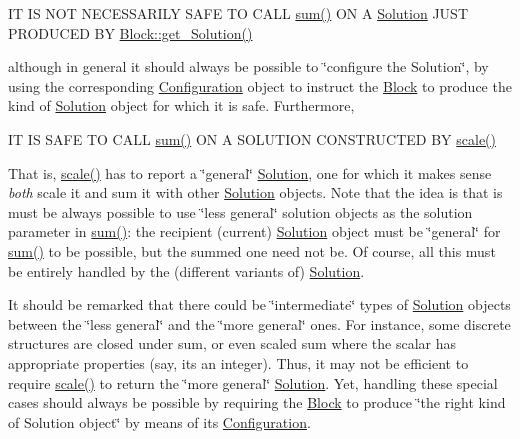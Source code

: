 IT IS N\+OT N\+E\+C\+E\+S\+S\+A\+R\+I\+LY S\+A\+FE TO C\+A\+LL \mbox{\hyperlink{class_s_m_spp__di__unipi__it_1_1_solution_adc2450947fd142657637bf79d91505a9}{sum()}} ON A \mbox{\hyperlink{class_s_m_spp__di__unipi__it_1_1_solution}{Solution}} J\+U\+ST P\+R\+O\+D\+U\+C\+ED BY \mbox{\hyperlink{class_s_m_spp__di__unipi__it_1_1_block_a1db67c2f65111af4314e79dfc81ba597}{Block\+::get\+\_\+\+Solution()}}

although in general it should always be possible to \char`\"{}configure the
\+Solution\char`\"{}, by using the corresponding \mbox{\hyperlink{class_s_m_spp__di__unipi__it_1_1_configuration}{Configuration}} object to instruct the \mbox{\hyperlink{class_s_m_spp__di__unipi__it_1_1_block}{Block}} to produce the kind of \mbox{\hyperlink{class_s_m_spp__di__unipi__it_1_1_solution}{Solution}} object for which it is safe. Furthermore,

IT IS S\+A\+FE TO C\+A\+LL \mbox{\hyperlink{class_s_m_spp__di__unipi__it_1_1_solution_adc2450947fd142657637bf79d91505a9}{sum()}} ON A S\+O\+L\+U\+T\+I\+ON C\+O\+N\+S\+T\+R\+U\+C\+T\+ED BY \mbox{\hyperlink{class_s_m_spp__di__unipi__it_1_1_solution_abf1a2d1763f128a72b2677d4b9ff4d3b}{scale()}}

That is, \mbox{\hyperlink{class_s_m_spp__di__unipi__it_1_1_solution_abf1a2d1763f128a72b2677d4b9ff4d3b}{scale()}} has to report a \char`\"{}general\char`\"{} \mbox{\hyperlink{class_s_m_spp__di__unipi__it_1_1_solution}{Solution}}, one for which it makes sense {\itshape both} scale it and sum it with other \mbox{\hyperlink{class_s_m_spp__di__unipi__it_1_1_solution}{Solution}} objects. Note that the idea is that is must be always possible to use \char`\"{}less
general\char`\"{} solution objects as the solution parameter in \mbox{\hyperlink{class_s_m_spp__di__unipi__it_1_1_solution_adc2450947fd142657637bf79d91505a9}{sum()}}\+: the recipient (current) \mbox{\hyperlink{class_s_m_spp__di__unipi__it_1_1_solution}{Solution}} object must be \char`\"{}general\char`\"{} for \mbox{\hyperlink{class_s_m_spp__di__unipi__it_1_1_solution_adc2450947fd142657637bf79d91505a9}{sum()}} to be possible, but the summed one need not be. Of course, all this must be entirely handled by the (different variants of) \mbox{\hyperlink{class_s_m_spp__di__unipi__it_1_1_solution}{Solution}}.

It should be remarked that there could be \char`\"{}intermediate\char`\"{} types of \mbox{\hyperlink{class_s_m_spp__di__unipi__it_1_1_solution}{Solution}} objects between the \char`\"{}less general\char`\"{} and the \char`\"{}more general\char`\"{} ones. For instance, some discrete structures are closed under sum, or even scaled sum where the scalar has appropriate properties (say, it\textquotesingle{}s an integer). Thus, it may not be efficient to require \mbox{\hyperlink{class_s_m_spp__di__unipi__it_1_1_solution_abf1a2d1763f128a72b2677d4b9ff4d3b}{scale()}} to return the \char`\"{}more general\char`\"{} \mbox{\hyperlink{class_s_m_spp__di__unipi__it_1_1_solution}{Solution}}. Yet, handling these special cases should always be possible by requiring the \mbox{\hyperlink{class_s_m_spp__di__unipi__it_1_1_block}{Block}} to produce \char`\"{}the right kind of Solution
object\char`\"{} by means of its \mbox{\hyperlink{class_s_m_spp__di__unipi__it_1_1_configuration}{Configuration}}. 

